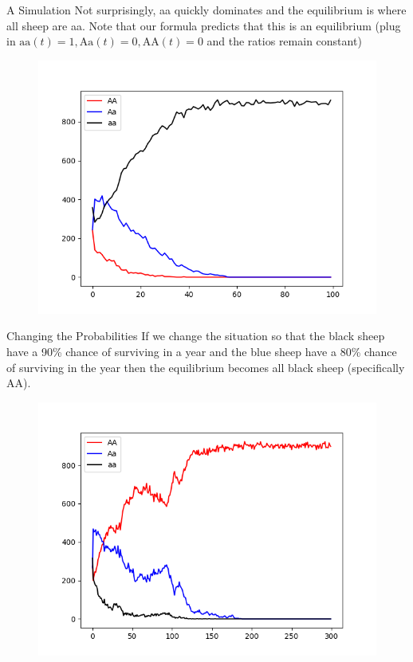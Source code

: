 \documentclass[xcolor=x11names, svgnames, rgb]{beamer}
\newcommand{\dom}{\text{AA}}
\newcommand{\het}{\text{Aa}}
\newcommand{\rec}{\text{aa}}
\begin{document}
\begin{frame}[t]{A Simulation}
	Not surprisingly, aa quickly dominates and the equilibrium is where all sheep are aa. Note that our formula predicts that this is an equilibrium (plug in $\rec(t) = 1, \het(t) = 0, \dom(t) = 0$ and the ratios remain constant)
\begin{center}
	\begin{figure}
		\includegraphics[width=0.7\linewidth]{sim1.png}
\end{figure}	
\end{center}	
\end{frame}

\begin{frame}[t]{Changing the Probabilities}
	If we change the situation so that the black sheep have a 90\% chance of surviving in a year and the blue sheep have a 80\% chance of surviving in the year then the equilibrium becomes all black sheep (specifically AA).

\begin{center}
	\begin{figure}
		\includegraphics[width=0.7\linewidth]{sim2.png} 
\end{figure}	
\end{center}	
	
\end{frame}
\end{document}
